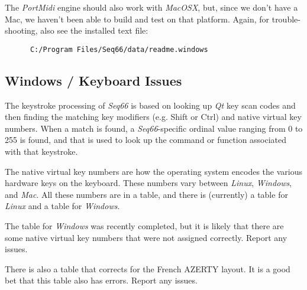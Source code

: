    The \textsl{PortMidi} engine should also work with \textsl{MacOSX}, but,
   since we don't have a Mac, we haven't been able to build and test
   on that platform.
   Again, for trouble-shooting, also see the installed text file:

   \begin{verbatim}
      C:/Program Files/Seq66/data/readme.windows
   \end{verbatim}

\subsection{Windows / Keyboard Issues}
\label{subsec:windows_keyboard_issues}

   The keystroke processing of \textsl{Seq66} is based on looking up
   \textsl{Qt} key scan codes and then finding the matching key modifiers (e.g.
   Shift or Ctrl) and native virtual key numbers.
   When a match is found, a \textsl{Seq66}-specific ordinal value ranging from
   0 to 255 is found, and that is used to look up the command or function
   associated with that keystroke.

   The native virtual key numbers are how the operating system
   encodes the various hardware keys on the keyboard.
   These numbers vary between
   \textsl{Linux},
   \textsl{Windows}, and
   \textsl{Mac}.
   All these numbers are in a table, and there is (currently)
   a table for \textsl{Linux} and a table for \textsl{Windows}.

   The table for \textsl{Windows} was recently completed, but
   it is likely that there are some native virtual key numbers
   that were not assigned correctly.
   Report any issues.

   There is also a table that corrects for
   the French AZERTY layout.
   It is a good bet that this table also has errors.
   Report any issues.

